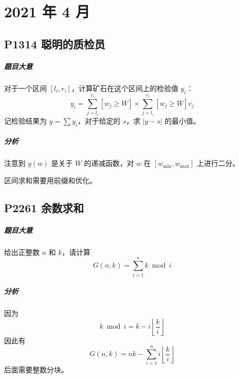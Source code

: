 \chapter{2021 年 4 月}

\section{P1314 聪明的质检员}

\paragraph{题目大意}

对于一个区间 $[l_i,r_i]$，计算矿石在这个区间上的检验值 $y_i$：
\[ y_i=\sum_{j=l_i}^{r_i}[w_j \geqslant W] \times \sum_{j=l_i}^{r_i}[w_j \geqslant W]v_j \]
记检验结果为 $y=\sum y_i$，对于给定的 $s$，求 $|y-s|$ 的最小值。

\paragraph{分析}

注意到 $y(w)$ 是关于 $W$ 的递减函数，对 $w$ 在 $[w_{\min},w_{\max}]$ 上进行二分。

区间求和需要用前缀和优化。

\section{P2261 余数求和}

\paragraph{题目大意}

给出正整数 $n$ 和 $k$，请计算
\[ G(n, k) = \sum_{i = 1}^n k \bmod i \]

\paragraph{分析}

因为
\[ k \bmod i = k - i \left\lfloor \frac{k}{i} \right\rfloor \]
因此有
\[ G(n,k) = nk - \sum_{i=1}^n i \left\lfloor \frac{k}{i} \right\rfloor  \]
后面需要整数分块。
